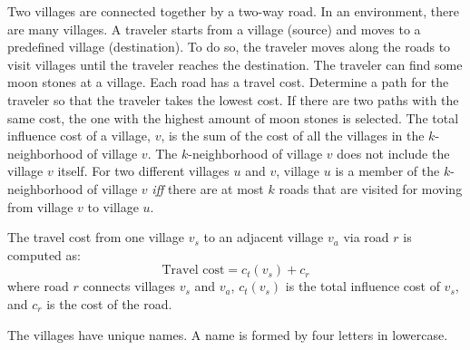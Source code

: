Two villages are connected together by a two-way road. 
In an environment, there are many villages. 
A traveler starts from a village (source) and moves to a predefined village 
(destination). 
To do so, the traveler moves along the roads to visit villages until the 
traveler reaches the destination. 
The traveler can find some moon stones at a village. 
Each road has a travel cost. 
Determine a path for the traveler so that the traveler takes the lowest cost. 
If there are two paths with the same cost, 
the one with the highest amount of moon stones is selected.
The total influence cost of a village, $v$, 
is the sum of the cost of all the villages in the $k$-neighborhood of 
village $v$. The $k$-neighborhood of village $v$ does not include the 
village $v$ itself. 
For two different villages $u$ and $v$, village $u$ is a member of the 
$k$-neighborhood of village $v$ \emph{iff} there are at most $k$ roads that are 
visited for moving from village $v$ to village $u$.

The travel cost from one village $v_s$ to an adjacent village $v_a$ 
via road $r$ is computed as:
$$\mbox{Travel cost} = c_t(v_s) + c_r$$
where road $r$ connects villages $v_s$ and $v_a$, 
$c_t(v_s)$ is the total influence cost of $v_s$, 
and $c_r$ is the cost of the road. 

The villages have unique names. 
A name is formed by four letters in lowercase.
